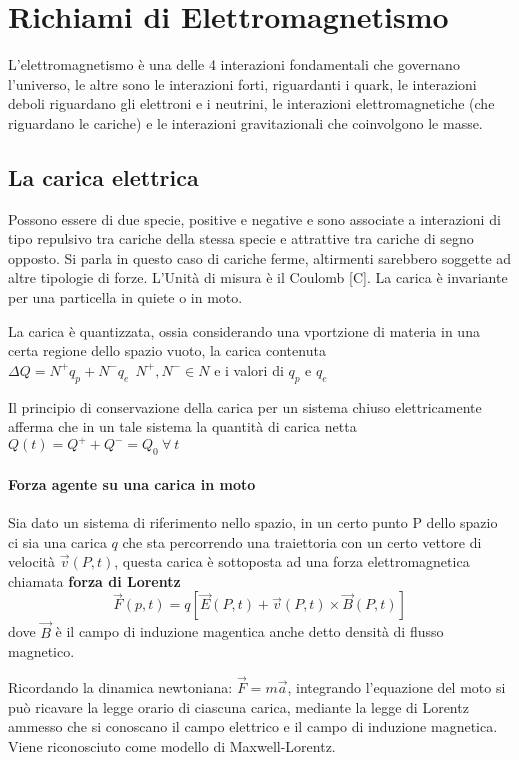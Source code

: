 \section{Richiami di Elettromagnetismo}
L'elettromagnetismo è una delle 4 interazioni fondamentali che governano l'universo, le altre
sono le interazioni forti, riguardanti i quark, le interazioni deboli riguardano gli elettroni e i 
neutrini, le interazioni elettromagnetiche (che riguardano le cariche) e le interazioni gravitazionali
che coinvolgono le masse.

\subsection{La carica elettrica}
Possono essere di due specie, positive e negative e sono associate a interazioni di tipo repulsivo tra
cariche della stessa specie e attrattive tra cariche di segno opposto.
Si parla in questo caso di cariche ferme, altirmenti sarebbero soggette ad altre tipologie di forze.
L'Unità di misura è il Coulomb [\si{\coulomb}].
La carica è invariante per una particella in quiete o in moto.

La carica è quantizzata, ossia considerando una vportzione di materia in una certa regione 
dello spazio vuoto, la carica contenuta $\Delta Q = N^+q_p + N^-q_e\ \ N^+,N^- \in N$
e i valori di $q_p$ e $q_e$ 

Il principio di conservazione della carica per un sistema chiuso elettricamente afferma che in un tale 
sistema la quantità di carica netta $Q(t) = Q^+ + Q^- = Q_0\ \forall\ t$

\paragraph{Forza agente su una carica in moto}

Sia dato un sistema di riferimento nello spazio, in un certo punto P dello spazio ci sia una carica $q$
che sta percorrendo una traiettoria con un certo vettore di velocità $\vec{v}(P,t)$, questa
carica è sottoposta ad una forza elettromagnetica chiamata \textbf{forza di Lorentz}
$$
\vec{F}(p,t) = q\left[\vec{E}(P,t)+\vec{v}(P,t)\times\vec{B}(P,t)\right]
$$
dove $\vec{B}$ è il campo di induzione magentica anche detto densità di flusso magnetico.

Ricordando la dinamica newtoniana: $\vec{F} = m\vec{a}$, integrando l'equazione del moto si può
ricavare la legge orario di ciascuna carica, mediante la legge di Lorentz ammesso che si conoscano 
il campo elettrico e il campo di induzione magnetica.
Viene riconosciuto come modello di Maxwell-Lorentz.

